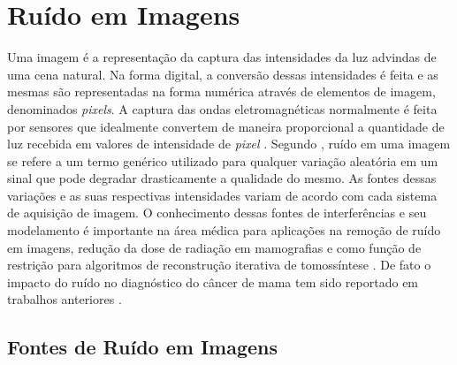 \chapter[Ruído em Imagens]{Ruído em Imagens}\label{Capitulo4}


Uma imagem é a representação da captura das intensidades da luz advindas de uma cena natural. Na forma digital, a conversão dessas intensidades é feita e as mesmas são representadas na forma numérica através de elementos de imagem, denominados \textit{pixels}. A captura das ondas eletromagnéticas normalmente é feita por sensores que idealmente convertem de maneira proporcional a quantidade de luz recebida em valores de intensidade de \textit{pixel}  \cite{bertalmiodenoising2018}. Segundo , ruído em uma imagem se refere a um termo genérico utilizado para qualquer variação aleatória em um sinal que pode degradar drasticamente a qualidade do mesmo. As fontes dessas variações e as suas respectivas intensidades variam de acordo com cada sistema de aquisição de imagem. O conhecimento dessas fontes de interferências e seu modelamento é importante na área médica para aplicações na remoção de ruído em imagens, redução da dose de radiação em mamografias e como função de restrição para algoritmos de reconstrução iterativa de tomossíntese \cite{wu2012dose, romualdo2013mammographic,borges2016method,borges2017pipeline,borges2017method,mackenzie2017characterisation,zheng2018detector}. De fato o impacto do ruído no diagnóstico do câncer de mama tem sido reportado em trabalhos anteriores \cite{haus2000screen,huda2003experimental,ruschin2007dose,saunders2007does, samei2007digital, mackenzie2016relationship}.


\section{Fontes de Ruído em Imagens}

